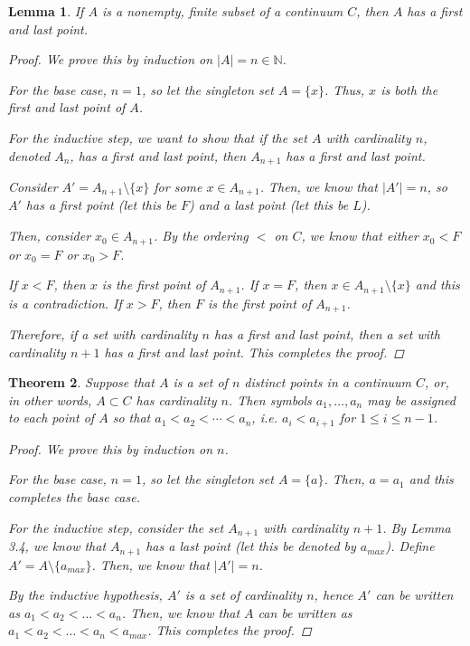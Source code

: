 \documentclass[11pt]{article}
\newcommand{\bbN}{\mathbb{N}}
\renewcommand{\_}[1]{\underline{ #1 }}
\newtheorem{theorem}{Theorem}[section]
\newtheorem{lemma}[theorem]{Lemma}
\theoremstyle{definition}
\numberwithin{equation}{subsection}
\begin{document}
\begin{lemma}  If $A$ is a nonempty, finite subset of a continuum $C$, then $A$ has a first and last point.
\begin{proof}
We prove this by induction on $|A| = n \in \bbN$.

For the base case, $n=1$, so let the singleton set $A = \{x\}$. Thus, $x$ is both the first and last point of $A$.

For the inductive step, we want to show that if the set $A$ with cardinality $n$, denoted $A_n$, has a first and last point, then $A_{n+1}$ has a first and last point.

Consider $A' = A_{n+1} \setminus \{x\}$ for some $x \in A_{n+1}$. Then, we know that $|A'|=n$, so $A'$ has a first point (let this be $F$) and a last point (let this be $L$).

Then, consider $x_0 \in A_{n+1}$. By the ordering $<$ on $C$, we know that either $x_0 < F$ or $x_0 = F$ or $x_0 > F$. 

If $x < F$, then $x$ is the first point of $A_{n+1}$. If $x = F$, then $x \in A_{n+1} \setminus \{x\}$ and this is a contradiction. If $x > F$, then $F$ is the first point of $A_{n+1}$.

Therefore, if a set with cardinality $n$ has a first and last point, then a set with cardinality $n+1$ has a first and last point. This completes the proof.

\renewcommand\qedsymbol{QED}
\end{proof}

\end{lemma}

\begin{theorem}  Suppose that $A$ is a set of $n$ distinct points in a continuum $C$, or, in other words, $A \subset C$ has cardinality $n$.  Then symbols $a_1, \dotsc, a_n$ may be assigned to each point of $A$ so that $a_1 < a_2 < \dotsm < a_n$, i.e. $a_i < a_{i + 1}$ for $1 \leq i \leq n - 1$.

\begin{proof}
We prove this by induction on $n$. 

For the base case, $n=1$, so let the singleton set $A = \{a\}$. Then, $a=a_1$ and this completes the base case.

For the inductive step, consider the set $A_{n+1}$ with cardinality $n+1$. By Lemma 3.4, we know that $A_{n+1}$ has a last point (let this be denoted by $a_{max}$). Define $A' = A \setminus \{a_{max}\}$. Then, we know that $|A'|=n$.

By the inductive hypothesis, $A'$ is a set of cardinality $n$, hence $A'$ can be written as $a_1 < a_2 < \dots < a_n$. Then, we know that $A$ can be written as $a_1 < a_2 < \dots < a_n < a_{max}$. This completes the proof.

\renewcommand\qedsymbol{QED}
\end{proof}

\end{theorem}
\end{document}
